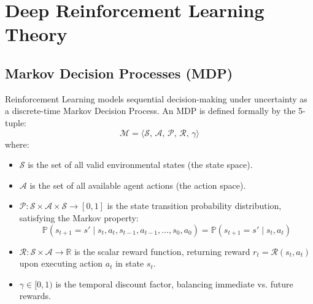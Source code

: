 \documentclass[12pt,a4paper,oneside]{report}
\begin{document}
\section{Deep Reinforcement Learning Theory}

\subsection{Markov Decision Processes (MDP)}
Reinforcement Learning models sequential decision-making under uncertainty as a discrete-time Markov Decision Process. An MDP is defined formally by the 5-tuple:
\begin{equation}
    \mathcal{M} = \langle \mathcal{S}, \, \mathcal{A}, \, \mathcal{P}, \, \mathcal{R}, \, \gamma \rangle
\end{equation}
where:
\begin{itemize}
    \item $\mathcal{S}$ is the set of all valid environmental states (the state space).
    \item $\mathcal{A}$ is the set of all available agent actions (the action space).
    \item $\mathcal{P}: \mathcal{S} \times \mathcal{A} \times \mathcal{S} \to [0, 1]$ is the state transition probability distribution, satisfying the Markov property:
    \begin{equation}
        \mathbb{P}(s_{t+1} = s' \mid s_t, a_t, s_{t-1}, a_{t-1}, \dots, s_0, a_0) = \mathbb{P}(s_{t+1} = s' \mid s_t, a_t)
    \end{equation}
    \item $\mathcal{R}: \mathcal{S} \times \mathcal{A} \to \mathbb{R}$ is the scalar reward function, returning reward $r_t = \mathcal{R}(s_t, a_t)$ upon executing action $a_t$ in state $s_t$.
    \item $\gamma \in [0, 1)$ is the temporal discount factor, balancing immediate vs. future rewards.
\end{itemize}
\end{document}
